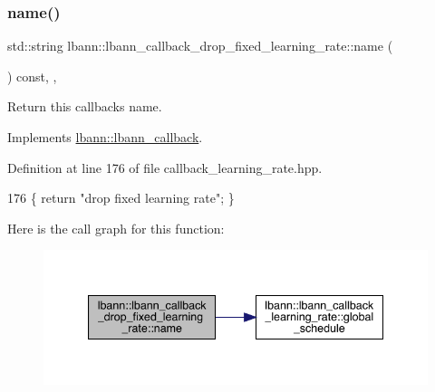 \subsubsection{\texorpdfstring{name()}{name()}}
{\footnotesize\ttfamily std\+::string lbann\+::lbann\+\_\+callback\+\_\+drop\+\_\+fixed\+\_\+learning\+\_\+rate\+::name (\begin{DoxyParamCaption}{ }\end{DoxyParamCaption}) const\hspace{0.3cm}{\ttfamily [inline]}, {\ttfamily [override]}, {\ttfamily [virtual]}}

Return this callback\textquotesingle{}s name. 

Implements \hyperlink{classlbann_1_1lbann__callback_a7522c7a14f1d6a1ea762cc2d7248eb3a}{lbann\+::lbann\+\_\+callback}.



Definition at line 176 of file callback\+\_\+learning\+\_\+rate.\+hpp.


\begin{DoxyCode}
176 \{ \textcolor{keywordflow}{return} \textcolor{stringliteral}{"drop fixed learning rate"}; \}
\end{DoxyCode}
Here is the call graph for this function\+:\nopagebreak
\begin{figure}[H]
\begin{center}
\leavevmode
\includegraphics[width=340pt]{classlbann_1_1lbann__callback__drop__fixed__learning__rate_a715d550fb9ec99e32861f91299669c35_cgraph}
\end{center}
\end{figure}
\mbox{\label{classlbann_1_1lbann__callback__drop__fixed__learning__rate_ab1c5f9e9d8019d203bbbc1652e2950bd}} 
